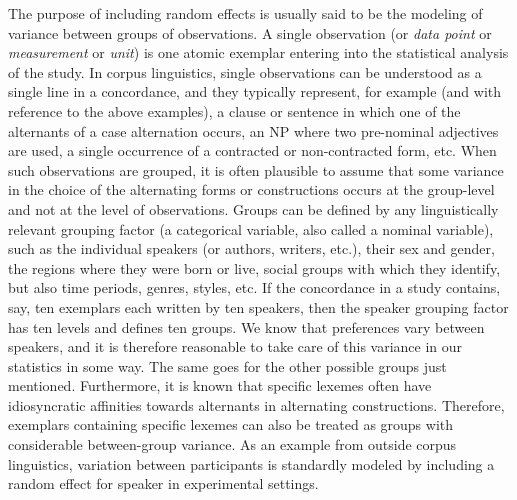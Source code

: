 \documentclass[a4paper,12pt]{article}
\begin{document}
The purpose of including random effects is usually said to be the modeling of variance between groups of observations.
A single observation (or \textit{data point} or \textit{measurement} or \textit{unit}) is one atomic exemplar entering into the statistical analysis of the study.
In corpus linguistics, single observations can be understood as a single line in a concordance, and they typically represent, for example (and with reference to the above examples), a clause or sentence in which one of the alternants of a case alternation occurs, an NP where two pre-nominal adjectives are used, a single occurrence of a contracted or non-contracted form, etc.
When such observations are grouped, it is often plausible to assume that some variance in the choice of the alternating forms or constructions occurs at the group-level and not at the level of observations.
Groups can be defined by any linguistically relevant grouping factor (a categorical variable, also called a nominal variable), such as the individual speakers (or authors, writers, etc.), their sex and gender, the regions where they were born or live, social groups with which they identify, but also time periods, genres, styles, etc.
If the concordance in a study contains, say, ten exemplars each written by ten speakers, then the speaker grouping factor has ten levels and defines ten groups.
We know that preferences vary between speakers, and it is therefore reasonable to take care of this variance in our statistics in some way.
The same goes for the other possible groups just mentioned.
Furthermore, it is known that specific lexemes often have idiosyncratic affinities towards alternants in alternating constructions.
Therefore, exemplars containing specific lexemes can also be treated as groups with considerable between-group variance.
As an example from outside corpus linguistics, variation between participants is standardly modeled by including a random effect for speaker in experimental settings.
\end{document}
